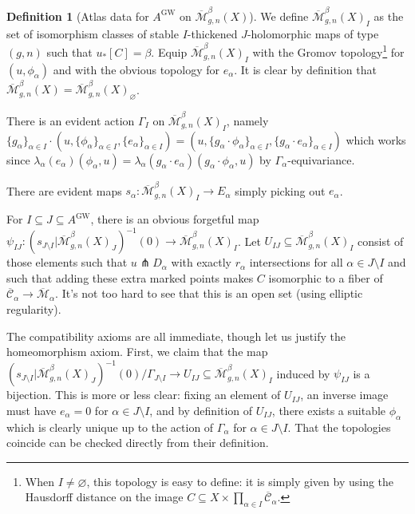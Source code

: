 \documentclass[12pt]{article}
\theoremstyle{definition}
\newtheorem{definition}[theorem]{Definition}
\theoremstyle{remark}
\numberwithin{equation}{subsection}
\newcommand{\Mbar}{\overline{\mathcal M}}
\newcommand{\Cbar}{\overline{\mathcal C}}
\newcommand{\GW}{\mathrm{GW}}
\begin{document}
\begin{definition}[Atlas data for $A^\GW$ on $\Mbar_{g,n}^\beta(X)$]\label{GWatlasdatadef}
We define $\Mbar_{g,n}^\beta(X)_I$ as the set of isomorphism classes of stable $I$-thickened $J$-holomorphic maps of type $(g,n)$ such that $u_\ast[C]=\beta$.  Equip $\Mbar_{g,n}^\beta(X)_I$ with the Gromov topology\footnote{When $I\ne\varnothing$, this topology is easy to define: it is simply given by using the Hausdorff distance on the image $C\subseteq X\times\prod_{\alpha\in I}\Cbar_\alpha$.} for $(u,\phi_\alpha)$ and with the obvious topology for $e_\alpha$.  It is clear by definition that $\Mbar_{g,n}^\beta(X)=\Mbar_{g,n}^\beta(X)_\varnothing$.

There is an evident action $\Gamma_I$ on $\Mbar_{g,n}^\beta(X)_I$, namely $\{g_\alpha\}_{\alpha\in I}\cdot(u,\{\phi_\alpha\}_{\alpha\in I},\{e_\alpha\}_{\alpha\in I})=(u,\{g_\alpha\cdot\phi_\alpha\}_{\alpha\in I},\{g_\alpha\cdot e_\alpha\}_{\alpha\in I})$ which works since $\lambda_\alpha(e_\alpha)(\phi_\alpha,u)=\lambda_\alpha(g_\alpha\cdot e_\alpha)(g_\alpha\cdot\phi_\alpha,u)$ by $\Gamma_\alpha$-equivariance.

There are evident maps $s_\alpha:\Mbar_{g,n}^\beta(X)_I\to E_\alpha$ simply picking out $e_\alpha$.  

For $I\subseteq J\subseteq A^\GW$, there is an obvious forgetful map $\psi_{IJ}:(s_{J\setminus I}|\Mbar_{g,n}^\beta(X)_J)^{-1}(0)\to\Mbar_{g,n}^\beta(X)_I$.  Let $U_{IJ}\subseteq\Mbar_{g,n}^\beta(X)_I$ consist of those elements such that $u\pitchfork D_\alpha$ with exactly $r_\alpha$ intersections for all $\alpha\in J\setminus I$ and such that adding these extra marked points makes $C$ isomorphic to a fiber of $\Cbar_\alpha\to\Mbar_\alpha$.  It's not too hard to see that this is an open set (using elliptic regularity).
\end{definition}

The compatibility axioms are all immediate, though let us justify the homeomorphism axiom.  First, we claim that the map $(s_{J\setminus I}|\Mbar_{g,n}^\beta(X)_J)^{-1}(0)/\Gamma_{J\setminus I}\to U_{IJ}\subseteq\Mbar_{g,n}^\beta(X)_I$ induced by $\psi_{IJ}$ is a bijection.  This is more or less clear: fixing an element of $U_{IJ}$, an inverse image must have $e_\alpha=0$ for $\alpha\in J\setminus I$, and by definition of $U_{IJ}$, there exists a suitable $\phi_\alpha$ which is clearly unique up to the action of $\Gamma_\alpha$ for $\alpha\in J\setminus I$.  That the topologies coincide can be checked directly from their definition.
\end{document}
